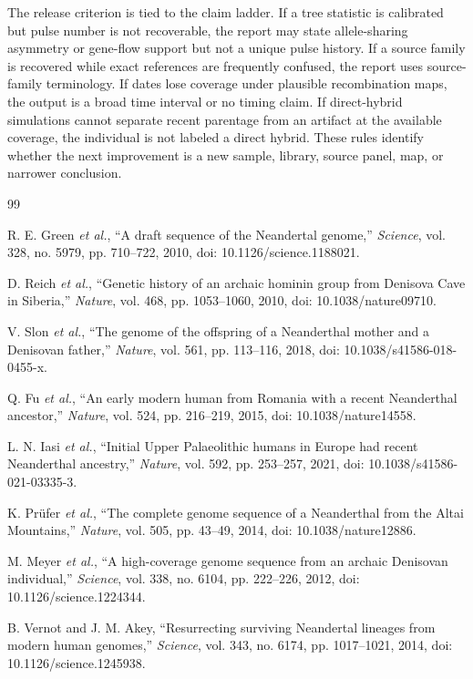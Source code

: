 \documentclass[conference]{IEEEtran}
\begin{document}
The release criterion is tied to the claim ladder. If a tree statistic is calibrated but pulse number is not recoverable, the report may state allele-sharing asymmetry or gene-flow support but not a unique pulse history. If a source family is recovered while exact references are frequently confused, the report uses source-family terminology. If dates lose coverage under plausible recombination maps, the output is a broad time interval or no timing claim. If direct-hybrid simulations cannot separate recent parentage from an artifact at the available coverage, the individual is not labeled a direct hybrid. These rules identify whether the next improvement is a new sample, library, source panel, map, or narrower conclusion.

\balance
\begin{thebibliography}{99}

R. E. Green \emph{et al.}, ``A draft sequence of the Neandertal genome,'' \emph{Science}, vol. 328, no. 5979, pp. 710--722, 2010, doi: 10.1126/science.1188021.

D. Reich \emph{et al.}, ``Genetic history of an archaic hominin group from Denisova Cave in Siberia,'' \emph{Nature}, vol. 468, pp. 1053--1060, 2010, doi: 10.1038/nature09710.

V. Slon \emph{et al.}, ``The genome of the offspring of a Neanderthal mother and a Denisovan father,'' \emph{Nature}, vol. 561, pp. 113--116, 2018, doi: 10.1038/s41586-018-0455-x.

Q. Fu \emph{et al.}, ``An early modern human from Romania with a recent Neanderthal ancestor,'' \emph{Nature}, vol. 524, pp. 216--219, 2015, doi: 10.1038/nature14558.

L. N. Iasi \emph{et al.}, ``Initial Upper Palaeolithic humans in Europe had recent Neanderthal ancestry,'' \emph{Nature}, vol. 592, pp. 253--257, 2021, doi: 10.1038/s41586-021-03335-3.

K. Pr\"ufer \emph{et al.}, ``The complete genome sequence of a Neanderthal from the Altai Mountains,'' \emph{Nature}, vol. 505, pp. 43--49, 2014, doi: 10.1038/nature12886.

M. Meyer \emph{et al.}, ``A high-coverage genome sequence from an archaic Denisovan individual,'' \emph{Science}, vol. 338, no. 6104, pp. 222--226, 2012, doi: 10.1126/science.1224344.

B. Vernot and J. M. Akey, ``Resurrecting surviving Neandertal lineages from modern human genomes,'' \emph{Science}, vol. 343, no. 6174, pp. 1017--1021, 2014, doi: 10.1126/science.1245938.


\end{thebibliography}
\end{document}
